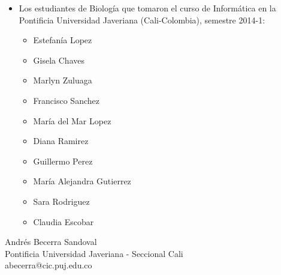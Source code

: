 \begin{itemize}

\item Los estudiantes de Biología que tomaron el curso de Informática
en la Pontificia Universidad Javeriana (Cali-Colombia), semestre 2014-1:

  \begin{itemize}
   \item Estefanía Lopez 
   \item Gisela Chaves 
   \item Marlyn Zuluaga 
   \item Francisco Sanchez
   \item María del Mar Lopez
   \item Diana Ramirez
   \item Guillermo Perez
   \item María Alejandra Gutierrez
   \item Sara Rodriguez
   \item Claudia Escobar 
  \end{itemize}
   
\end{itemize}

\vspace{0.25in}
\begin{flushleft}
Andrés Becerra Sandoval \\
Pontificia Universidad Javeriana - Seccional Cali \\
abecerra@cic.puj.edu.co \\

\end{flushleft}


